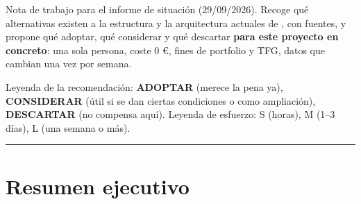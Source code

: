 \begin{nota}
Nota de trabajo para el informe de situación (29/09/2026). Recoge qué alternativas existen a la estructura y la arquitectura actuales de , con fuentes, y propone qué adoptar, qué considerar y qué descartar \textbf{para este proyecto en concreto}: una sola persona, coste 0 €, fines de portfolio y TFG, datos que cambian una vez por semana.

Leyenda de la recomendación: \textbf{ADOPTAR} (merece la pena ya), \textbf{CONSIDERAR} (útil si se dan ciertas condiciones o como ampliación), \textbf{DESCARTAR} (no compensa aquí). Leyenda de esfuerzo: S (horas), M (1–3 días), L (una semana o más).
\end{nota}

\medskip\noindent\textcolor{muted!40}{\rule{\linewidth}{0.3pt}}\medskip

\section{Resumen ejecutivo}

